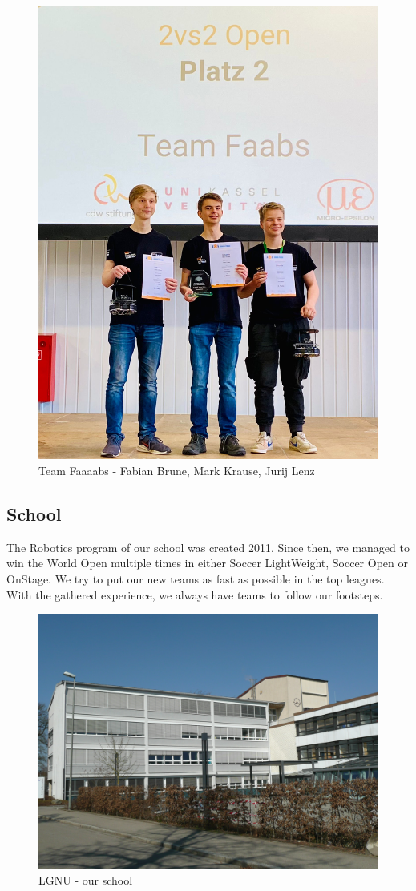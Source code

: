\documentclass{scrartcl}
\begin{document}
\begin{figure}[h]
    \centering
    \includegraphics[width=0.75\linewidth, ]{img/Siegerehrung Kassel 1.png}
    \caption{Team Faaaabs - Fabian Brune, Mark Krause, Jurij Lenz}
    \label{fig:team}
\end{figure}

\newpage

\subsection{School}

The Robotics program of our school was created 2011. Since then, we managed to win the World Open
multiple times in either Soccer LightWeight, Soccer Open or OnStage.
We try to put our new teams as fast as possible in the top leagues. With the gathered experience, we always
have teams to follow our footsteps.
\newline
\begin{figure}[h]
    \centering
    \includegraphics[width=\textwidth]{img/lgnu.png}
    \caption{LGNU - our school}
    \label{fig:lgnu}
\end{figure}
\end{document}
